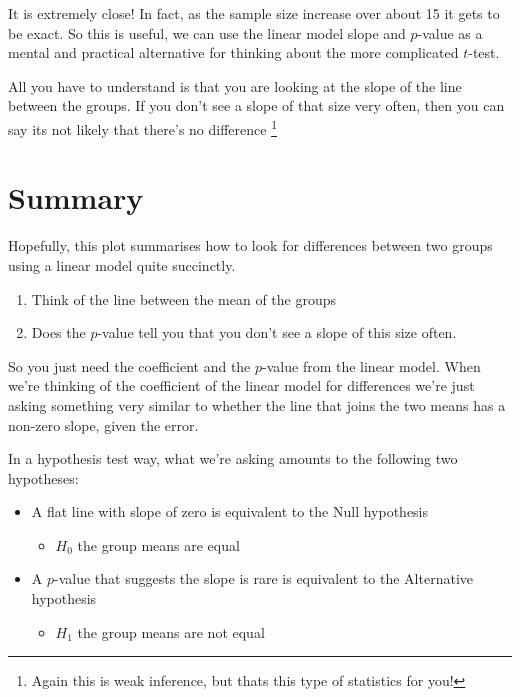 \documentclass[]{book}
\providecommand{\tightlist}{%
  \setlength{\itemsep}{0pt}\setlength{\parskip}{0pt}}
\begin{document}
It is extremely close! In fact, as the sample size increase over about 15 it gets to be exact. So this is useful, we can use the linear model slope and \(p\)-value as a mental and practical alternative for thinking about the more complicated \(t\)-test.

All you have to understand is that you are looking at the slope of the line between the groups. If you don't see a slope of that size very often, then you can say its not likely that there's no difference \footnote{Again this is weak inference, but thats this type of statistics for you!}

\hypertarget{summary}{%
\section{Summary}\label{summary}}

Hopefully, this plot summarises how to look for differences between two groups using a linear model quite succinctly.

\begin{enumerate}
\def\labelenumi{\arabic{enumi}.}
\tightlist
\item
  Think of the line between the mean of the groups
\item
  Does the \(p\)-value tell you that you don't see a slope of this size often.
\end{enumerate}

So you just need the coefficient and the \(p\)-value from the linear model.
When we're thinking of the coefficient of the linear model for differences we're just asking something very similar to whether the line that joins the two means has a non-zero slope, given the error.

In a hypothesis test way, what we're asking amounts to the following two hypotheses:

\begin{itemize}
\tightlist
\item
  A flat line with slope of zero is equivalent to the Null hypothesis

  \begin{itemize}
  \tightlist
  \item
    \(H_{0}\) the group means are equal
  \end{itemize}
\item
  A \(p\)-value that suggests the slope is rare is equivalent to the Alternative hypothesis

  \begin{itemize}
  \tightlist
  \item
    \(H_{1}\) the group means are not equal
  \end{itemize}
\end{itemize}
\end{document}
